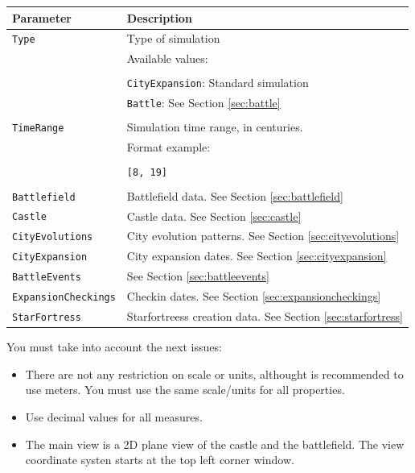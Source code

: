 \documentclass[tog]{acmsiggraph}
\begin{document}
\begin{tabularx}{0.48\textwidth}{ |l|X| }
\hline 
\textbf{Parameter} & \textbf{Description} \\[0.15cm]
\hline
\texttt{Type} & Type of simulation\\
 & Available values: \\
 & \\
 & \quad\texttt{CityExpansion}: Standard simulation \\
 & \quad\texttt{Battle}: See Section \ref{sec:battle} \\
 & \\
 \hline 
 \texttt{TimeRange} & Simulation time range, in centuries. \\
 & Format example: \\
 & \\
 & \quad\texttt{[8, 19]} \\
 & \\
 \hline
 \texttt{Battlefield} & Battlefield data. See Section \ref{sec:battlefield} \\
 \hline
 \texttt{Castle} & Castle data. See Section \ref{sec:castle} \\
 \hline
 \texttt{CityEvolutions} & City evolution patterns. See Section \ref{sec:cityevolutions} \\
 \hline
 \texttt{CityExpansion} & City expansion dates. See Section \ref{sec:cityexpansion} \\
 \hline
 \texttt{BattleEvents} & See Section \ref{sec:battleevents} \\
 \hline
 \texttt{ExpansionCheckings} & Checkin dates. See Section \ref{sec:expansioncheckings}\\
 \hline
 \texttt{StarFortress} & Starfortreess creation data. See Section \ref{sec:starfortress} \\
 \hline
\end{tabularx} 




You must take into account the next issues:

\begin{itemize}
 \item There are not any restriction on scale or units, althought is recommended to use meters. You must use the same scale/units for all properties.
 \item Use decimal values for all measures.
 \item The main view is a 2D plane view of the castle and the battlefield. The view coordinate systen starts at the top left corner window.
\end{itemize}
\end{document}
